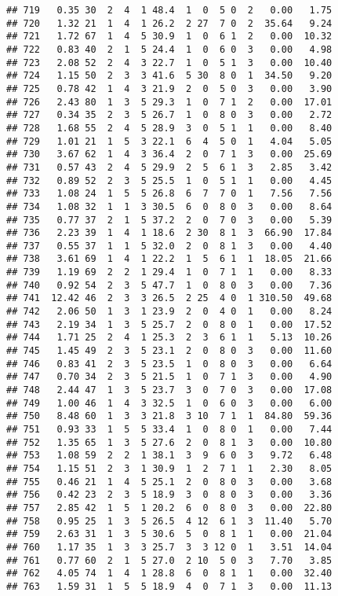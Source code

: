 \documentclass[
]{article}
\begin{document}
\begin{verbatim}
## 719   0.35 30  2  4  1 48.4  1  0  5 0  2   0.00   1.75
## 720   1.32 21  1  4  1 26.2  2 27  7 0  2  35.64   9.24
## 721   1.72 67  1  4  5 30.9  1  0  6 1  2   0.00  10.32
## 722   0.83 40  2  1  5 24.4  1  0  6 0  3   0.00   4.98
## 723   2.08 52  2  4  3 22.7  1  0  5 1  3   0.00  10.40
## 724   1.15 50  2  3  3 41.6  5 30  8 0  1  34.50   9.20
## 725   0.78 42  1  4  3 21.9  2  0  5 0  3   0.00   3.90
## 726   2.43 80  1  3  5 29.3  1  0  7 1  2   0.00  17.01
## 727   0.34 35  2  3  5 26.7  1  0  8 0  3   0.00   2.72
## 728   1.68 55  2  4  5 28.9  3  0  5 1  1   0.00   8.40
## 729   1.01 21  1  5  3 22.1  6  4  5 0  1   4.04   5.05
## 730   3.67 62  1  4  3 36.4  2  0  7 1  3   0.00  25.69
## 731   0.57 43  2  4  5 29.9  2  5  6 1  3   2.85   3.42
## 732   0.89 52  2  3  5 25.5  1  0  5 1  1   0.00   4.45
## 733   1.08 24  1  5  5 26.8  6  7  7 0  1   7.56   7.56
## 734   1.08 32  1  1  3 30.5  6  0  8 0  3   0.00   8.64
## 735   0.77 37  2  1  5 37.2  2  0  7 0  3   0.00   5.39
## 736   2.23 39  1  4  1 18.6  2 30  8 1  3  66.90  17.84
## 737   0.55 37  1  1  5 32.0  2  0  8 1  3   0.00   4.40
## 738   3.61 69  1  4  1 22.2  1  5  6 1  1  18.05  21.66
## 739   1.19 69  2  2  1 29.4  1  0  7 1  1   0.00   8.33
## 740   0.92 54  2  3  5 47.7  1  0  8 0  3   0.00   7.36
## 741  12.42 46  2  3  3 26.5  2 25  4 0  1 310.50  49.68
## 742   2.06 50  1  3  1 23.9  2  0  4 0  1   0.00   8.24
## 743   2.19 34  1  3  5 25.7  2  0  8 0  1   0.00  17.52
## 744   1.71 25  2  4  1 25.3  2  3  6 1  1   5.13  10.26
## 745   1.45 49  2  3  5 23.1  2  0  8 0  3   0.00  11.60
## 746   0.83 41  2  3  5 23.5  1  0  8 0  3   0.00   6.64
## 747   0.70 34  2  3  5 21.5  1  0  7 1  3   0.00   4.90
## 748   2.44 47  1  3  5 23.7  3  0  7 0  3   0.00  17.08
## 749   1.00 46  1  4  3 32.5  1  0  6 0  3   0.00   6.00
## 750   8.48 60  1  3  3 21.8  3 10  7 1  1  84.80  59.36
## 751   0.93 33  1  5  5 33.4  1  0  8 0  1   0.00   7.44
## 752   1.35 65  1  3  5 27.6  2  0  8 1  3   0.00  10.80
## 753   1.08 59  2  2  1 38.1  3  9  6 0  3   9.72   6.48
## 754   1.15 51  2  3  1 30.9  1  2  7 1  1   2.30   8.05
## 755   0.46 21  1  4  5 25.1  2  0  8 0  3   0.00   3.68
## 756   0.42 23  2  3  5 18.9  3  0  8 0  3   0.00   3.36
## 757   2.85 42  1  5  1 20.2  6  0  8 0  3   0.00  22.80
## 758   0.95 25  1  3  5 26.5  4 12  6 1  3  11.40   5.70
## 759   2.63 31  1  3  5 30.6  5  0  8 1  1   0.00  21.04
## 760   1.17 35  1  3  3 25.7  3  3 12 0  1   3.51  14.04
## 761   0.77 60  2  1  5 27.0  2 10  5 0  3   7.70   3.85
## 762   4.05 74  1  4  1 28.8  6  0  8 1  1   0.00  32.40
## 763   1.59 31  1  5  5 18.9  4  0  7 1  3   0.00  11.13

\end{verbatim}
\end{document}
